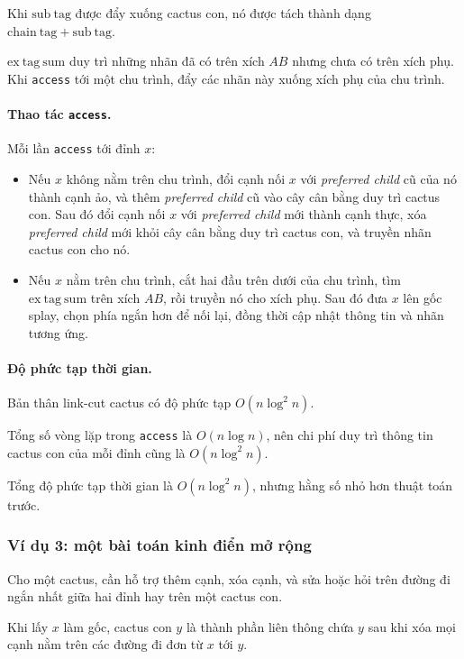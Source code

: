 \documentclass[11pt]{article}
\begin{document}
Khi \(\mathrm{sub\ tag}\) được đẩy xuống cactus con, nó được tách thành dạng
\(\mathrm{chain\ tag}+\mathrm{sub\ tag}\).

\(\mathrm{ex\ tag\ sum}\) duy trì những nhãn đã có trên xích \(AB\) nhưng chưa
có trên xích phụ. Khi \texttt{access} tới một chu trình, đẩy các nhãn này xuống
xích phụ của chu trình.

\paragraph{Thao tác \texttt{access}.}
Mỗi lần \texttt{access} tới đỉnh \(x\):
\begin{itemize}
  \item Nếu \(x\) không nằm trên chu trình, đổi cạnh nối \(x\) với
  \emph{preferred child} cũ của nó thành cạnh ảo, và thêm \emph{preferred
  child} cũ vào cây cân bằng duy trì cactus con. Sau đó đổi cạnh nối \(x\) với
  \emph{preferred child} mới thành cạnh thực, xóa \emph{preferred child} mới
  khỏi cây cân bằng duy trì cactus con, và truyền nhãn cactus con cho nó.
  \item Nếu \(x\) nằm trên chu trình, cắt hai đầu trên dưới của chu trình, tìm
  \(\mathrm{ex\ tag\ sum}\) trên xích \(AB\), rồi truyền nó cho xích phụ. Sau
  đó đưa \(x\) lên gốc splay, chọn phía ngắn hơn để nối lại, đồng thời cập nhật
  thông tin và nhãn tương ứng.
\end{itemize}

\paragraph{Độ phức tạp thời gian.}
Bản thân link-cut cactus có độ phức tạp \(O(n\log^2 n)\).

Tổng số vòng lặp trong \texttt{access} là \(O(n\log n)\), nên chi phí duy trì
thông tin cactus con của mỗi đỉnh cũng là \(O(n\log^2 n)\).

Tổng độ phức tạp thời gian là \(O(n\log^2 n)\), nhưng hằng số nhỏ hơn thuật
toán trước.

\subsubsection{Ví dụ 3: một bài toán kinh điển mở rộng}

Cho một cactus, cần hỗ trợ thêm cạnh, xóa cạnh, và sửa hoặc hỏi trên đường đi
ngắn nhất giữa hai đỉnh hay trên một cactus con.

Khi lấy \(x\) làm gốc, cactus con \(y\) là thành phần liên thông chứa \(y\) sau
khi xóa mọi cạnh nằm trên các đường đi đơn từ \(x\) tới \(y\).
\end{document}
